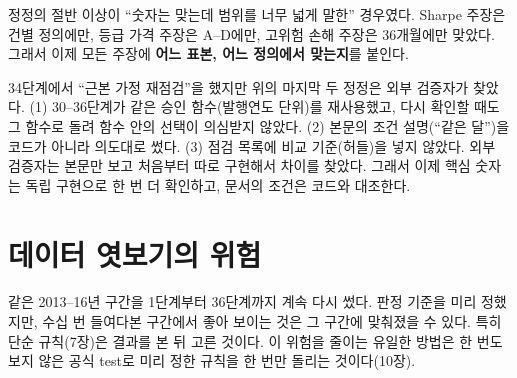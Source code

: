 \begin{insight}[정정에서 배운 것]
정정의 절반 이상이 ``숫자는 맞는데 범위를 너무 넓게 말한'' 경우였다. Sharpe 주장은 건별 정의에만, 등급 가격 주장은 A--D에만, 고위험 손해 주장은 36개월에만 맞았다. 그래서 이제 모든 주장에 \textbf{어느 표본, 어느 정의에서 맞는지}를 붙인다.
\end{insight}

\begin{warnbox}
34단계에서 ``근본 가정 재점검''을 했지만 위의 마지막 두 정정은 외부 검증자가 찾았다. (1) 30--36단계가 같은 승인 함수(발행연도 단위)를 재사용했고, 다시 확인할 때도 그 함수로 돌려 함수 안의 선택이 의심받지 않았다. (2) 본문의 조건 설명(``같은 달'')을 코드가 아니라 의도대로 썼다. (3) 점검 목록에 비교 기준(허들)을 넣지 않았다. 외부 검증자는 본문만 보고 처음부터 따로 구현해서 차이를 찾았다. 그래서 이제 핵심 숫자는 독립 구현으로 한 번 더 확인하고, 문서의 조건은 코드와 대조한다.
\end{warnbox}

\section{데이터 엿보기의 위험}
같은 2013--16년 구간을 1단계부터 36단계까지 계속 다시 썼다. 판정 기준을 미리 정했지만, 수십 번 들여다본 구간에서 좋아 보이는 것은 그 구간에 맞춰졌을 수 있다. 특히 단순 규칙(7장)은 결과를 본 뒤 고른 것이다. 이 위험을 줄이는 유일한 방법은 한 번도 보지 않은 공식 test로 미리 정한 규칙을 한 번만 돌리는 것이다(10장).
